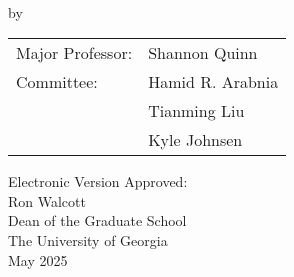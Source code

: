 \documentclass[12pt, notitlepage, twoside]{report}
\begin{document}

\newcommand{\degreesearned}{%
    M.S., Iran University of Science and Technology (IUST), Iran, 2016 \\
}%

\newcommand{\degreetype}{Dissertation}
\newcommand{\degreetitle}{Doctor of Philosophy}
\newcommand{\degreename}{Computer Science}
\newcommand{\degreeyear}{2025}
\maketitlepage





\newpage
\thispagestyle{empty}
\vspace*{18pt}
\begin{center}
    \textsc{\doctitle}\\[18pt]
    by\\[18pt]
    \textsc{\docauthor}
\end{center}
\vfill

\begin{flushright}
    \begin{tabular}{ll}
        Major Professor: & Shannon Quinn    \\ [8pt]
        Committee:       & Hamid R. Arabnia \\
                         & Tianming Liu     \\
                         & Kyle Johnsen     \\
    \end{tabular}
\end{flushright}

\vspace*{3cm}

\begin{flushleft}
    Electronic Version Approved:\\[12pt]
    Ron Walcott\\
    Dean of the Graduate School\\
    The University of Georgia\\
    May 2025
\end{flushleft}
\vspace*{1.5cm}
\end{document}
